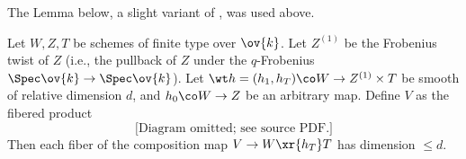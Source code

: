 The Lemma below, a slight variant of \cite[Lemma 2.13]{Laff18}, was used above.

\begin{lemma}
\notready\label{l:VL}
Let $W,Z, T$ be schemes of finite type over $\ov{k}$. Let $Z^{(1)}$ be the Frobenius twist of $Z$ (i.e., the pullback of $Z$ under the $q$-Frobenius $\Spec \ov{k}\to \Spec \ov{k}$). Let $\wt h = (h_1, h_T) \co W \rightarrow Z^{(1)} \times T$ be smooth of relative dimension $d$, and $h_{0}\co W \rightarrow Z$ be an arbitrary map. Define $V$ as the fibered product
\[
\text{[Diagram omitted; see source PDF.]}
\]
Then  each fiber of the composition map $V \rightarrow W\xr{h_{T}}T$ has dimension $\le d$.
\end{lemma}

